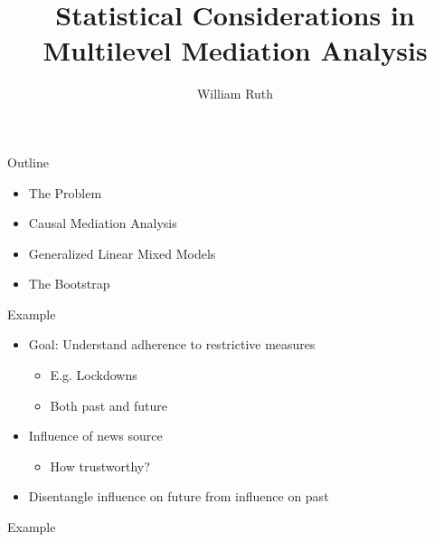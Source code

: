 \documentclass[14pt]{beamer}
\title[]{Statistical Considerations in Multilevel Mediation Analysis}
\author{William Ruth}
\institute[]{Collaborators: Rado Ramasy, Rowin Alfaro, Ariel Mundo, Bouchra Nasri}
\date{\vspace{-3cm}}
\begin{document}
\begin{frame}
    \titlepage
\end{frame}

\begin{frame}{Outline}
    \begin{itemize}
        \setlength{\itemsep}{1em}
        \item The Problem
        \item Causal Mediation Analysis
        \item Generalized Linear Mixed Models
        \item The Bootstrap
    \end{itemize}
\end{frame}

\begin{frame}{Example}
    \begin{itemize}
        \item Goal: Understand adherence to restrictive measures
        \begin{itemize}
            \item E.g. Lockdowns
            \item Both past and future \newline
        \end{itemize}
        \item Influence of news source
        \begin{itemize}
            \item How trustworthy? \newline
        \end{itemize}
        \item Disentangle influence on future from influence on past
    \end{itemize}
    
\end{frame}


\begin{frame}{Example}
        \begin{figure}[H]
    \end{figure}
\end{frame}
\end{document}
